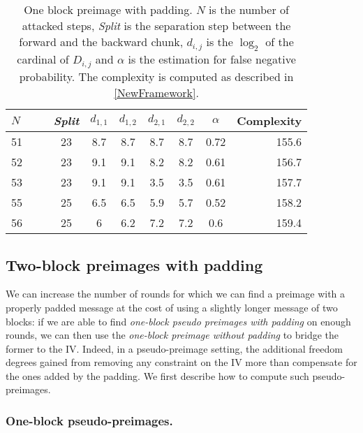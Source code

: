   \begin{table}[htb]
    \caption[One block preimage with padding.]{One block preimage with padding. $N$ is the 
              number of attacked steps, \emph{Split} is the separation step between the
              forward and the backward chunk, $d_{i,j}$ is the $\log_2$ of the cardinal
              of $D_{i,j}$ and $\alpha$ is the estimation for false negative probability. The complexity
              is computed as described in \autoref{NewFramework}.\label{SHA12}}
    \begin{center}
      \begin{tabular}{l c c c c c c r @{}} \toprule
        $N\qquad$ &  \emph{Split} & $d_{1,1}$ &  $d_{1,2}$ & $d_{2,1}$ & $d_{2,2}$ & $\alpha $ & Complexity \\\midrule
      51    & 23  & 8.7  & 8.7 & 8.7 & 8.7  & 0.72  & 155.6\\ 
      52    & 23  & 9.1  & 9.1 & 8.2 & 8.2  & 0.61  & 156.7\\ 
      53    & 23  & 9.1  & 9.1 & 3.5 & 3.5  & 0.61  & 157.7\\ 
      55    & 25  & 6.5  & 6.5 & 5.9 & 5.7  & 0.52  & 158.2\\ 
      56    & 25  & 6  & 6.2 & 7.2 & 7.2  & 0.6  & 159.4\\ 
        \bottomrule
        \hline
      \end{tabular}
    \end{center}
  \end{table}



  \subsection{Two-block preimages with padding}
\label{sec:one_two}


  We can increase the number of rounds for which we can find a preimage with a properly padded
  message at the cost of using a slightly longer message of two blocks: if we are able to find
  \emph{one-block pseudo preimages with padding} on enough rounds, we can then use the
  \emph{one-block preimage without padding} to bridge the former to the IV. Indeed,
  in a pseudo-preimage
  setting, the additional freedom degrees gained from removing any constraint on the IV
  more than compensate for the ones added by the padding. We first describe
  how to compute such pseudo-preimages.

  \subsubsection{One-block pseudo-preimages.}

